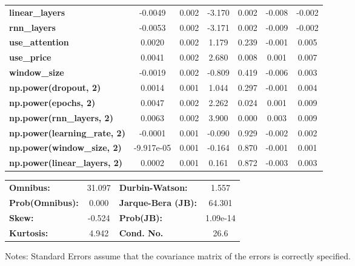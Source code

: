 \begin{center}
\begin{tabular}{lcccccc}
\textbf{linear\_layers}              &      -0.0049  &        0.002     &    -3.170  &         0.002        &       -0.008    &       -0.002     \\
\textbf{rnn\_layers}                 &      -0.0053  &        0.002     &    -3.171  &         0.002        &       -0.009    &       -0.002     \\
\textbf{use\_attention}              &       0.0020  &        0.002     &     1.179  &         0.239        &       -0.001    &        0.005     \\
\textbf{use\_price}                  &       0.0041  &        0.002     &     2.680  &         0.008        &        0.001    &        0.007     \\
\textbf{window\_size}                &      -0.0019  &        0.002     &    -0.809  &         0.419        &       -0.006    &        0.003     \\
\textbf{np.power(dropout, 2)}        &       0.0014  &        0.001     &     1.044  &         0.297        &       -0.001    &        0.004     \\
\textbf{np.power(epochs, 2)}         &       0.0047  &        0.002     &     2.262  &         0.024        &        0.001    &        0.009     \\
\textbf{np.power(rnn\_layers, 2)}    &       0.0063  &        0.002     &     3.900  &         0.000        &        0.003    &        0.009     \\
\textbf{np.power(learning\_rate, 2)} &      -0.0001  &        0.001     &    -0.090  &         0.929        &       -0.002    &        0.002     \\
\textbf{np.power(window\_size, 2)}   &   -9.917e-05  &        0.001     &    -0.164  &         0.870        &       -0.001    &        0.001     \\
\textbf{np.power(linear\_layers, 2)} &       0.0002  &        0.001     &     0.161  &         0.872        &       -0.003    &        0.003     \\
\bottomrule
\end{tabular}
\begin{tabular}{lclc}
\textbf{Omnibus:}       & 31.097 & \textbf{  Durbin-Watson:     } &    1.557  \\
\textbf{Prob(Omnibus):} &  0.000 & \textbf{  Jarque-Bera (JB):  } &   64.301  \\
\textbf{Skew:}          & -0.524 & \textbf{  Prob(JB):          } & 1.09e-14  \\
\textbf{Kurtosis:}      &  4.942 & \textbf{  Cond. No.          } &     26.6  \\
\bottomrule
\end{tabular}
\end{center}

Notes: \newline
 [1] Standard Errors assume that the covariance matrix of the errors is correctly specified.